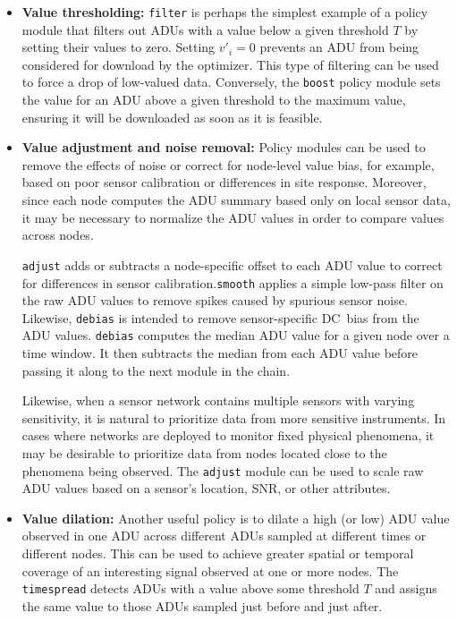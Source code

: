 \begin{itemize}

\item \textbf{Value thresholding:} \texttt{filter} is perhaps the simplest
example of a policy module that filters out ADUs with a value below a given
threshold $T$ by setting their values to zero. Setting $v'_i = 0$ prevents
an ADU from being considered for download by the optimizer. This type of
filtering can be used to force a drop of low-valued data. Conversely, the
\texttt{boost} policy module sets the value for an ADU above a given
threshold to the maximum value, ensuring it will be downloaded as soon as it
is feasible.

\item \textbf{Value adjustment and noise removal:} Policy modules can be used
to remove the effects of noise or correct for node-level value bias, for
example, based on poor sensor calibration or differences in site response.
Moreover, since each node computes the ADU summary based only on local sensor
data, it may be necessary to normalize the ADU values in order to compare
values across nodes.

\hspace{0.25in} \texttt{adjust} adds or subtracts a node-specific offset to
each ADU value to correct for differences in sensor
calibration.\texttt{smooth} applies a simple low-pass filter on the raw ADU
values to remove spikes caused by spurious sensor noise. Likewise,
\texttt{debias} is intended to remove sensor-specific DC~bias from the ADU
values. \texttt{debias} computes the median ADU value for a given node over a
time window. It then subtracts the median from each ADU value before passing
it along to the next module in the chain.

\hspace{0.25in} Likewise, when a sensor network contains multiple sensors
with varying sensitivity, it is natural to prioritize data from more
sensitive instruments. In cases where networks are deployed to monitor fixed
physical phenomena, it may be desirable to prioritize data from nodes located
close to the phenomena being observed. The \texttt{adjust} module can be used
to scale raw ADU values based on a sensor's location, SNR, or other
attributes.

\item \textbf{Value dilation:} Another useful policy is to dilate a high (or
low) ADU value observed in one ADU across different ADUs sampled at different
times or different nodes. This can be used to achieve greater spatial or
temporal coverage of an interesting signal observed at one or more nodes. The
\texttt{timespread} detects ADUs with a value above some threshold $T$ and
assigns the same value to those ADUs sampled just before and just after.


\end{itemize}
